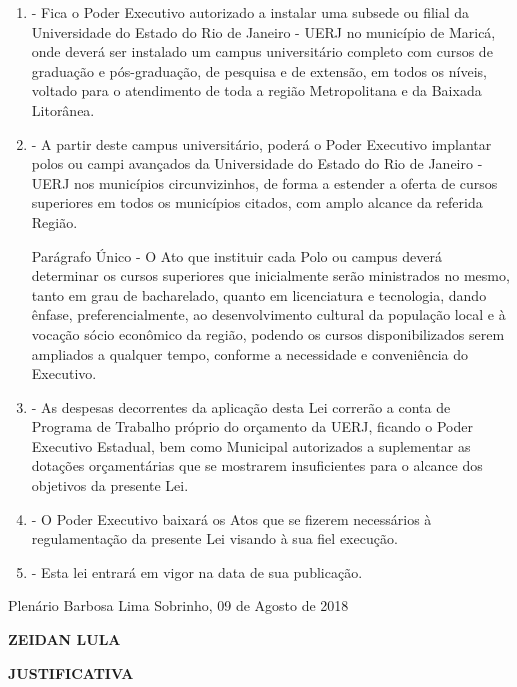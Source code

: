\documentclass[10pt]{article}
\begin{document}
\begin{enumerate}[label=Art. \arabic*\textdegree]

\item - Fica o Poder Executivo autorizado a instalar uma subsede ou filial da Universidade do Estado do Rio de Janeiro - UERJ no município de Maricá, onde deverá ser instalado um campus universitário completo com cursos de graduação e pós-graduação, de pesquisa e de extensão, em todos os níveis, voltado para o atendimento de toda a região Metropolitana e da Baixada Litorânea.

\item - A partir deste campus universitário, poderá o Poder Executivo implantar polos ou campi avançados da Universidade do Estado do Rio de Janeiro - UERJ nos municípios circunvizinhos, de forma a estender a oferta de cursos superiores em todos os municípios citados, com amplo alcance da referida Região.

Parágrafo Único - O Ato que instituir cada Polo ou campus deverá determinar os cursos superiores que inicialmente serão ministrados no mesmo, tanto em grau de bacharelado, quanto em licenciatura e tecnologia, dando ênfase, preferencialmente, ao desenvolvimento cultural da população local e à vocação sócio econômico da região, podendo os cursos disponibilizados serem ampliados a qualquer tempo, conforme a necessidade e conveniência do Executivo.

\item - As despesas decorrentes da aplicação desta Lei correrão a conta de Programa de Trabalho próprio do orçamento da UERJ, ficando o Poder Executivo Estadual, bem como Municipal autorizados a suplementar as dotações orçamentárias que se mostrarem insuficientes para o alcance dos objetivos da presente Lei.

\item - O Poder Executivo baixará os Atos que se fizerem necessários à regulamentação da presente Lei visando à sua fiel execução.

\item - Esta lei entrará em vigor na data de sua publicação.


\end{enumerate}




\begin{center}
  Plenário Barbosa Lima Sobrinho, 09 de Agosto de 2018

   \bigskip

  \textbf{ ZEIDAN LULA}

  \bigskip

  \textbf{JUSTIFICATIVA}
  \bigskip

\end{center}
\end{document}
